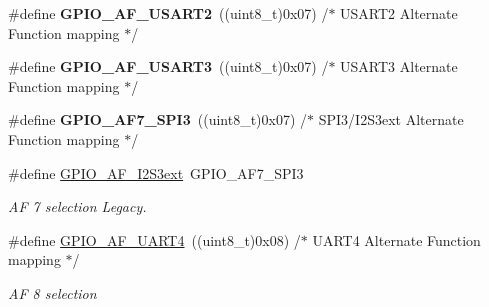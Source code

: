 \begin{DoxyCompactItemize}
\#define {\bfseries G\+P\+I\+O\+\_\+\+A\+F\+\_\+\+U\+S\+A\+R\+T2}~((uint8\+\_\+t)0x07)  /$\ast$ U\+S\+A\+R\+T2 Alternate Function mapping  $\ast$/
\item 
\mbox{\label{group___g_p_i_o___alternat__function__selection__define_ga97742da355d32c599527813eaf109ec7}} 
\#define {\bfseries G\+P\+I\+O\+\_\+\+A\+F\+\_\+\+U\+S\+A\+R\+T3}~((uint8\+\_\+t)0x07)  /$\ast$ U\+S\+A\+R\+T3 Alternate Function mapping  $\ast$/
\item 
\mbox{\label{group___g_p_i_o___alternat__function__selection__define_ga35733bc86ec4a7141898a9c2b7ca644a}} 
\#define {\bfseries G\+P\+I\+O\+\_\+\+A\+F7\+\_\+\+S\+P\+I3}~((uint8\+\_\+t)0x07)  /$\ast$ S\+P\+I3/\+I2\+S3ext Alternate Function mapping $\ast$/
\item 
\mbox{\label{group___g_p_i_o___alternat__function__selection__define_ga8fac28d42bc99794bb74707c141fc0f6}} 
\#define \mbox{\hyperlink{group___g_p_i_o___alternat__function__selection__define_ga8fac28d42bc99794bb74707c141fc0f6}{G\+P\+I\+O\+\_\+\+A\+F\+\_\+\+I2\+S3ext}}~G\+P\+I\+O\+\_\+\+A\+F7\+\_\+\+S\+P\+I3
\begin{DoxyCompactList}\small\item\em AF 7 selection Legacy. \end{DoxyCompactList}\item 
\mbox{\label{group___g_p_i_o___alternat__function__selection__define_gad1754187e64b66681cc1447695062706}} 
\#define \mbox{\hyperlink{group___g_p_i_o___alternat__function__selection__define_gad1754187e64b66681cc1447695062706}{G\+P\+I\+O\+\_\+\+A\+F\+\_\+\+U\+A\+R\+T4}}~((uint8\+\_\+t)0x08)  /$\ast$ U\+A\+R\+T4 Alternate Function mapping  $\ast$/
\begin{DoxyCompactList}\small\item\em AF 8 selection ~\newline
 \end{DoxyCompactList}\item 
\mbox{\label{group___g_p_i_o___alternat__function__selection__define_ga6250acb0f2f3de33bc8e78615852cc48}} 

\end{DoxyCompactItemize}
